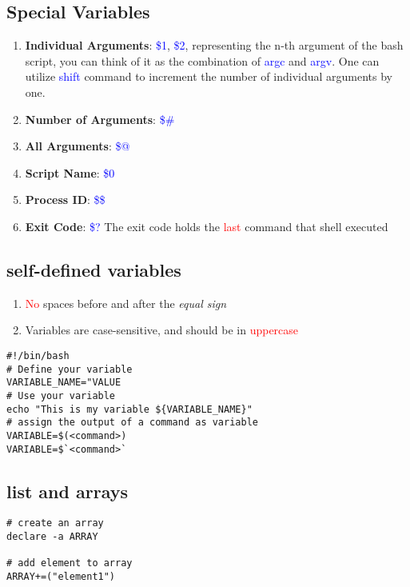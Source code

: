\documentclass[12pt,a4paper]{article}
\newcommand{\rt}[1]{\textcolor{red}{#1}}
\newcommand{\bt}[1]{\textcolor{blue}{#1}}
\begin{document}
\subsection{Special Variables}
\begin{enumerate}
	\item \textbf{Individual Arguments}: \bt{\$1}, \bt{\$2}, representing the n-th argument of the bash script, you can think of it as the combination of \bt{argc} and \bt{argv}. One can utilize \bt{shift} command to increment the number of individual arguments by one.
	\item \textbf{Number of Arguments}: \bt{\$\#}
	\item \textbf{All Arguments}: \bt{\$@}
	\item \textbf{Script Name}: \bt{\$0}
	\item \textbf{Process ID}: \bt{\$\$}
	\item \textbf{Exit Code}: \bt{\$?} The exit code holds the \rt{last} command that shell executed
\end{enumerate}

\subsection{self-defined variables}
\begin{enumerate}
	\item \rt{No} spaces before and after the \textit{equal sign}
	\item Variables are case-sensitive, and should be in \rt{uppercase}
\end{enumerate}
\begin{footnotesize}
\begin{verbatim}
#!/bin/bash
# Define your variable
VARIABLE_NAME="VALUE
# Use your variable
echo "This is my variable ${VARIABLE_NAME}"
# assign the output of a command as variable
VARIABLE=$(<command>)
VARIABLE=$`<command>`
\end{verbatim}
\end{footnotesize}

\subsection{list and arrays}
\begin{footnotesize}
\begin{verbatim}
# create an array
declare -a ARRAY

# add element to array
ARRAY+=("element1")
\end{verbatim}
\end{footnotesize}
\end{document}
